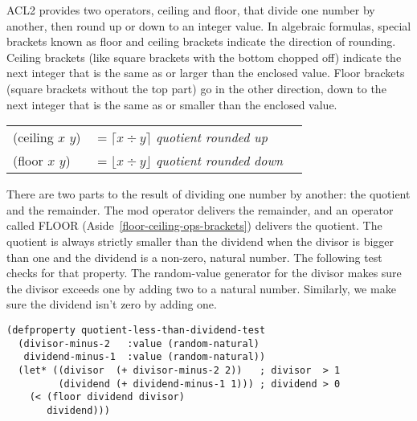 \begin{aside}
ACL2 provides two operators,
ceiling and floor, that divide one number by another,
then round up or down to an integer value.
In algebraic formulas, special brackets known as
floor and ceiling brackets indicate the direction of rounding.
Ceiling brackets (like square brackets with the bottom chopped off)
indicate the next integer that is the same as or larger than
the enclosed value.
Floor brackets (square brackets without the top part)
go in the other direction, down to the next integer
that is the same as or smaller than the enclosed value.
\\
\begin{center}
\begin{tabular}{lll}
(ceiling $x$ $y$)& $= \lceil x  \div y \rceil $ \emph{quotient rounded up}   \\
(floor $x$ $y$)  & $= \lfloor x \div y \rfloor$ \emph{quotient rounded down} \\
\end{tabular}
\end{center}
\caption{Floor and Ceiling Operators, Floor and Ceiling Brackets}
\label{floor-def}
\label{ceiling-def}
\label{floor-ceiling-ops-brackets}
\end{aside}

There are two parts to the result
of dividing one number by another: the quotient and the remainder.
The mod operator delivers the remainder,
and an operator called FLOOR (Aside~\ref{floor-ceiling-ops-brackets})
delivers the quotient.
The quotient is always strictly smaller
than the dividend when the divisor is bigger than one
and the dividend is a non-zero, natural number.
The following test checks for that property.
The random-value generator for the divisor
makes sure the divisor exceeds one by adding two
to a natural number.
Similarly, we make sure the dividend isn't zero by adding one.

\label{quotient-less-than-dividend-test}
\begin{Verbatim}
(defproperty quotient-less-than-dividend-test
  (divisor-minus-2   :value (random-natural)
   dividend-minus-1  :value (random-natural))
  (let* ((divisor  (+ divisor-minus-2 2))   ; divisor  > 1
         (dividend (+ dividend-minus-1 1))) ; dividend > 0
    (< (floor dividend divisor)
       dividend)))
\end{Verbatim}

